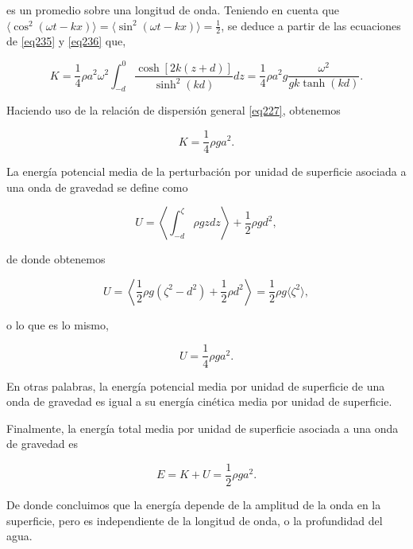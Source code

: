 \noindent es un promedio sobre una longitud de onda. Teniendo en cuenta que $\langle \cos^2(\omega t-kx)\rangle = \langle\sin^2(\omega t-kx) \rangle = \tfrac{1}{2} $, se deduce a partir de las ecuaciones de \ref{eq235} y \ref{eq236} que,

\begin{equation}\label{eq240}
   K = \frac{1}{4} \rho a^2 \omega^2 \int_{-d}^0 \frac{\cosh[2k(z+d)]}{\sinh^2(kd)}dz =  \frac{1}{4} \rho a^2 g \frac{\omega^2}{gk\tanh(kd)}.
\end{equation}

\noindent Haciendo uso de la relación de dispersión general \ref{eq227}, obtenemos

\begin{equation}\label{eq241}
   K = \frac{1}{4} \rho g a^2.
\end{equation}

La energía potencial media de la perturbación por unidad de superficie asociada a una onda de gravedad se define como

\begin{equation}\label{eq242}
   U = \left\langle \int_{-d}^\zeta \rho g z dz \right\rangle + \frac{1}{2} \rho gd^{2},
\end{equation}

\noindent de donde obtenemos

\begin{equation}\label{eq243}
   U = \left\langle \frac{1}{2} \rho g (\zeta^{2}-d^{2}) + \frac{1}{2} \rho d^2 \right\rangle = \frac{1}{2} \rho g \langle \zeta^{2} \rangle,
\end{equation}

\noindent o lo que es lo mismo,

\begin{equation}\label{eq244}
   U = \frac{1}{4} \rho g a^{2}.
\end{equation}

\noindent En otras palabras, la energía potencial media por unidad de superficie de una onda de gravedad es igual a su energía cinética media por unidad de superficie.

Finalmente, la energía total media por unidad de superficie asociada a una onda de gravedad es

\begin{equation}\label{eq245}
   E = K + U = \frac{1}{2} \rho g a^{2}.
\end{equation}

\noindent De donde concluimos que la energía depende de la amplitud de la onda en la superficie, pero es independiente de la longitud de onda, o la profundidad del agua.

